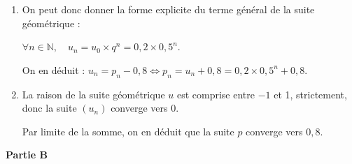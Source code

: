 \documentclass[10pt]{article}
\providecommand{\N}{\mathbb{N}}
\begin{document}
\begin{enumerate}
\begin{enumerate}
La relation de récurrence de la suite $\left(u_n\right)$ est donc bien celle d'une suite géométrique, de raison $q = 0,5$. 

Le premier terme de la suite est $u_0 = p_0 - 0,8 = 1 - 0,8 = 0,2$.

		\item On peut donc donner la forme explicite du terme général de la suite géométrique :

$\forall n \in \N, \quad u_n = u_0 \times q^n = 0,2\times 0,5^n$.

On en déduit : $u_n = p_n - 0,8 \iff p_n = u_n + 0,8 = 0,2\times 0,5^n + 0,8$.

		\item La raison de la suite géométrique $u$ est comprise entre $- 1$ et 1, strictement, donc la suite $\left(u_n\right)$ converge vers 0.

Par limite de la somme, on en déduit que la suite $p$ converge vers $0,8$.
	\end{enumerate}
\end{enumerate}

\bigskip
\textbf{Partie B}
\medskip
\end{document}
